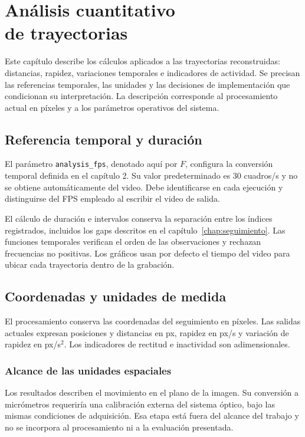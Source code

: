 \chapter[Análisis cuantitativo de trayectorias]{Análisis cuantitativo\\de trayectorias}
\label{chap:analisis-trayectorias}

Este capítulo describe los cálculos aplicados a las trayectorias reconstruidas: distancias, rapidez, variaciones temporales e indicadores de actividad. Se precisan las referencias temporales, las unidades y las decisiones de implementación que condicionan su interpretación. La descripción corresponde al procesamiento actual en píxeles y a los parámetros operativos del sistema.

\section{Referencia temporal y duración}

El parámetro \texttt{analysis\_fps}, denotado aquí por $F$, configura la conversión temporal definida en el capítulo 2. Su valor predeterminado es $30$ cuadros/s y no se obtiene automáticamente del video. Debe identificarse en cada ejecución y distinguirse del FPS empleado al escribir el video de salida.

El cálculo de duración e intervalos conserva la separación entre los índices registrados, incluidos los gaps descritos en el capítulo~\ref{chap:seguimiento}. Las funciones temporales verifican el orden de las observaciones y rechazan frecuencias no positivas. Los gráficos usan por defecto el tiempo del video para ubicar cada trayectoria dentro de la grabación.

\section{Coordenadas y unidades de medida}

El procesamiento conserva las coordenadas del seguimiento en píxeles. Las salidas actuales expresan posiciones y distancias en px, rapidez en px/s y variación de rapidez en px/s$^2$. Los indicadores de rectitud e inactividad son adimensionales.

\subsection{Alcance de las unidades espaciales}

Los resultados describen el movimiento en el plano de la imagen. Su conversión a micrómetros requeriría una calibración externa del sistema óptico, bajo las mismas condiciones de adquisición. Esa etapa está fuera del alcance del trabajo y no se incorpora al procesamiento ni a la evaluación presentada.


